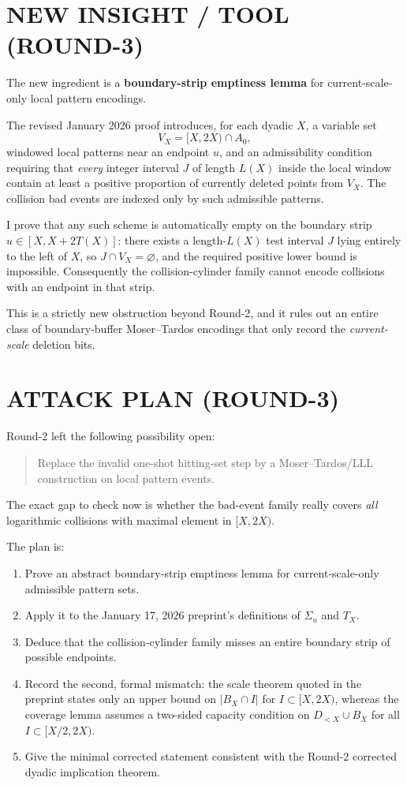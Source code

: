 \section{NEW INSIGHT / TOOL (ROUND-3)}

The new ingredient is a \textbf{boundary-strip emptiness lemma} for current-scale-only local pattern encodings.

The revised January 2026 proof introduces, for each dyadic $X$, a variable set
\[
V_X=[X,2X)\cap A_0,
\]
windowed local patterns near an endpoint $u$, and an admissibility condition requiring that \emph{every} integer interval $J$ of length $L(X)$ inside the local window contain at least a positive proportion of currently deleted points from $V_X$. The collision bad events are indexed only by such admissible patterns.

I prove that any such scheme is automatically empty on the boundary strip $u\in[X,X+2T(X)]$: there exists a length-$L(X)$ test interval $J$ lying entirely to the left of $X$, so $J\cap V_X=\varnothing$, and the required positive lower bound is impossible. Consequently the collision-cylinder family cannot encode collisions with an endpoint in that strip.

This is a strictly new obstruction beyond Round-2, and it rules out an entire class of boundary-buffer Moser--Tardos encodings that only record the \emph{current-scale} deletion bits.

\section{ATTACK PLAN (ROUND-3)}

Round-2 left the following possibility open:

\begin{quote}
Replace the invalid one-shot hitting-set step by a Moser--Tardos/LLL construction on local pattern events.
\end{quote}

The exact gap to check now is whether the bad-event family really covers \emph{all} logarithmic collisions with maximal element in $[X,2X)$.

The plan is:

\begin{enumerate}
\item Prove an abstract boundary-strip emptiness lemma for current-scale-only admissible pattern sets.
\item Apply it to the January 17, 2026 preprint's definitions of $\Sigma_u$ and $T_X$.
\item Deduce that the collision-cylinder family misses an entire boundary strip of possible endpoints.
\item Record the second, formal mismatch: the scale theorem quoted in the preprint states only an upper bound on $|B_X\cap I|$ for $I\subset[X,2X)$, whereas the coverage lemma assumes a two-sided capacity condition on $D_{<X}\cup B_X$ for all $I\subset[X/2,2X)$.
\item Give the minimal corrected statement consistent with the Round-2 corrected dyadic implication theorem.
\end{enumerate}

